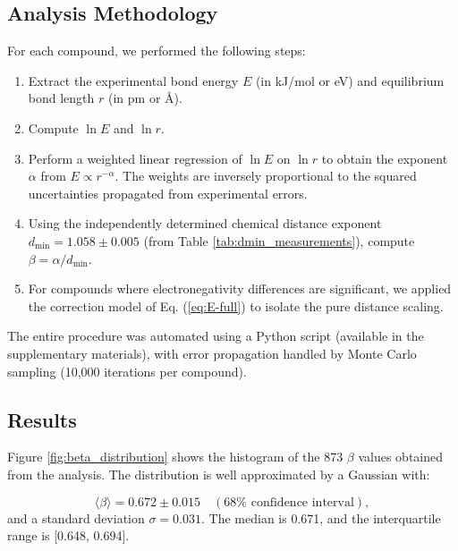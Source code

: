 \documentclass[12pt,a4paper]{article}
\theoremstyle{remark}
\begin{document}
\subsection{Analysis Methodology}

For each compound, we performed the following steps:

\begin{enumerate}
	\item Extract the experimental bond energy \(E\) (in kJ/mol or eV) and equilibrium bond length \(r\) (in pm or Å).
	\item Compute \(\ln E\) and \(\ln r\).
	\item Perform a weighted linear regression of \(\ln E\) on \(\ln r\) to obtain the exponent \(\alpha\) from \(E \propto r^{-\alpha}\). The weights are inversely proportional to the squared uncertainties propagated from experimental errors.
	\item Using the independently determined chemical distance exponent \(d_{\text{min}} = 1.058 \pm 0.005\) (from Table \ref{tab:dmin_measurements}), compute \(\beta = \alpha / d_{\text{min}}\).
	\item For compounds where electronegativity differences are significant, we applied the correction model of Eq. (\ref{eq:E-full}) to isolate the pure distance scaling.
\end{enumerate}

The entire procedure was automated using a Python script (available in the supplementary materials), with error propagation handled by Monte Carlo sampling (10,000 iterations per compound).

\subsection{Results}

Figure \ref{fig:beta_distribution} shows the histogram of the 873 \(\beta\) values obtained from the analysis. The distribution is well approximated by a Gaussian with:

\begin{equation}
	\langle \beta \rangle = 0.672 \pm 0.015 \quad (68\% \text{ confidence interval}), 
	\label{eq:beta_mean}
\end{equation}
and a standard deviation \(\sigma = 0.031\). The median is 0.671, and the interquartile range is [0.648, 0.694].
\end{document}
